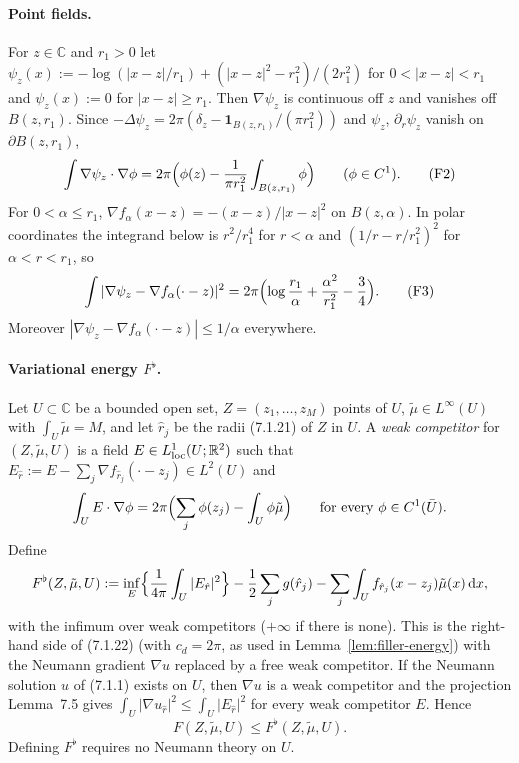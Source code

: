 \documentclass[11pt]{article}
\theoremstyle{definition}
\theoremstyle{remark}
\newcommand{\R}{\mathbb R}
\newcommand{\C}{\mathbb C}
\newcommand{\dd}{\,\mathrm d}
\begin{document}
\paragraph{Point fields.} For $z\in\C$ and $r_1>0$ let
$\psi_z(x):=-\log(|x-z|/r_1)+(|x-z|^2-r_1^2)/(2r_1^2)$ for $0<|x-z|<r_1$ and $\psi_z(x):=0$ for
$|x-z|\ge r_1$. Then $\nabla\psi_z$ is continuous off $z$ and vanishes off $B(z,r_1)$. Since
$-\Delta\psi_z=2\pi(\delta_z-\mathbf 1_{B(z,r_1)}/(\pi r_1^2))$ and $\psi_z$, $\partial_r\psi_z$ vanish on
$\partial B(z,r_1)$,
\[
\int\nabla\psi_z\cdot\nabla\phi=2\pi\Bigl(\phi(z)-\frac1{\pi r_1^2}\int_{B(z,r_1)}\phi\Bigr)
\qquad(\phi\in C^1).
\tag{F2}
\]
For $0<\alpha\le r_1$, $\nabla f_\alpha(x-z)=-(x-z)/|x-z|^2$ on $B(z,\alpha)$. In polar coordinates the
integrand below is $r^2/r_1^4$ for $r<\alpha$ and $(1/r-r/r_1^2)^2$ for $\alpha<r<r_1$, so
\[
\int|\nabla\psi_z-\nabla f_\alpha(\cdot-z)|^2=2\pi\Bigl(\log\frac{r_1}\alpha+\frac{\alpha^2}{r_1^2}-\frac34\Bigr).
\tag{F3}
\]
Moreover $|\nabla\psi_z-\nabla f_\alpha(\cdot-z)|\le1/\alpha$ everywhere.

\paragraph{Variational energy $F^\flat$.} Let $U\subset\C$ be a bounded open set, $Z=(z_1,\dots,z_M)$ points
of $U$, $\tilde\mu\in L^\infty(U)$ with $\int_U\tilde\mu=M$, and let $\hat r_j$ be the radii (7.1.21) of $Z$ in
$U$. A \emph{weak competitor} for $(Z,\tilde\mu,U)$ is a field $E\in L^1_{\rm loc}(U;\R^2)$ such that
$E_{\hat r}:=E-\sum_j\nabla f_{\hat r_j}(\cdot-z_j)\in L^2(U)$ and
\[
\int_UE\cdot\nabla\phi=2\pi\Bigl(\sum_j\phi(z_j)-\int_U\phi\tilde\mu\Bigr)\qquad\text{for every }\phi\in C^1(\bar U).
\]
Define
\[
F^\flat(Z,\tilde\mu,U):=\inf_{E}\Bigl\{\frac1{4\pi}\int_U|E_{\hat r}|^2\Bigr\}-\frac12\sum_jg(\hat r_j)
-\sum_j\int_Uf_{\hat r_j}(x-z_j)\tilde\mu(x)\dd x ,
\]
with the infimum over weak competitors ($+\infty$ if there is none). This is the right-hand side of (7.1.22)
(with $c_d=2\pi$, as used in Lemma~\ref{lem:filler-energy}) with the Neumann gradient $\nabla u$ replaced
by a free weak competitor. If the Neumann solution $u$ of (7.1.1) exists on $U$, then $\nabla u$ is a weak
competitor and the projection Lemma~7.5 gives $\int_U|\nabla u_{\hat r}|^2\le\int_U|E_{\hat r}|^2$ for every
weak competitor $E$. Hence
\[
F(Z,\tilde\mu,U)\le F^\flat(Z,\tilde\mu,U).
\]
Defining $F^\flat$ requires no Neumann theory on $U$.
\end{document}
